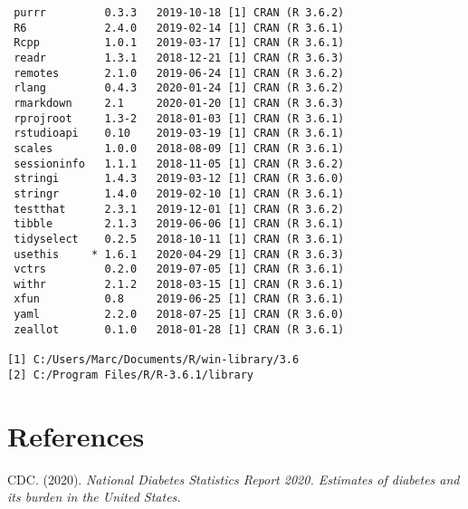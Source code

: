 \documentclass [11pt, proquest] {uwthesis}[2015/03/03]
\begin{document}
\begin{verbatim}
 purrr         0.3.3   2019-10-18 [1] CRAN (R 3.6.2)                       
 R6            2.4.0   2019-02-14 [1] CRAN (R 3.6.1)                       
 Rcpp          1.0.1   2019-03-17 [1] CRAN (R 3.6.1)                       
 readr         1.3.1   2018-12-21 [1] CRAN (R 3.6.3)                       
 remotes       2.1.0   2019-06-24 [1] CRAN (R 3.6.2)                       
 rlang         0.4.3   2020-01-24 [1] CRAN (R 3.6.2)                       
 rmarkdown     2.1     2020-01-20 [1] CRAN (R 3.6.3)                       
 rprojroot     1.3-2   2018-01-03 [1] CRAN (R 3.6.1)                       
 rstudioapi    0.10    2019-03-19 [1] CRAN (R 3.6.1)                       
 scales        1.0.0   2018-08-09 [1] CRAN (R 3.6.1)                       
 sessioninfo   1.1.1   2018-11-05 [1] CRAN (R 3.6.2)                       
 stringi       1.4.3   2019-03-12 [1] CRAN (R 3.6.0)                       
 stringr       1.4.0   2019-02-10 [1] CRAN (R 3.6.1)                       
 testthat      2.3.1   2019-12-01 [1] CRAN (R 3.6.2)                       
 tibble        2.1.3   2019-06-06 [1] CRAN (R 3.6.1)                       
 tidyselect    0.2.5   2018-10-11 [1] CRAN (R 3.6.1)                       
 usethis     * 1.6.1   2020-04-29 [1] CRAN (R 3.6.3)                       
 vctrs         0.2.0   2019-07-05 [1] CRAN (R 3.6.1)                       
 withr         2.1.2   2018-03-15 [1] CRAN (R 3.6.1)                       
 xfun          0.8     2019-06-25 [1] CRAN (R 3.6.1)                       
 yaml          2.2.0   2018-07-25 [1] CRAN (R 3.6.0)                       
 zeallot       0.1.0   2018-01-28 [1] CRAN (R 3.6.1)                       

[1] C:/Users/Marc/Documents/R/win-library/3.6
[2] C:/Program Files/R/R-3.6.1/library
\end{verbatim}
\backmatter

\chapter*{References}\label{references}


\noindent

\setlength{\parindent}{-0.20in} \setlength{\leftskip}{0.20in}
\setlength{\parskip}{8pt}

\hypertarget{refs}{}
\hypertarget{ref-CDC2020}{}
CDC. (2020). \emph{National Diabetes Statistics Report 2020. Estimates
of diabetes and its burden in the United States.}
\end{document}
